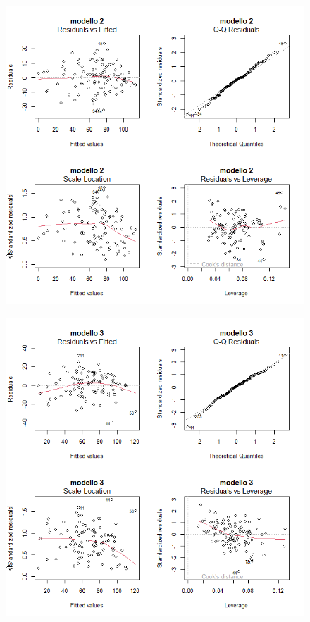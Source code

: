 \begin{figure}[H]
	\centering
	\includegraphics[width=0.95\linewidth]{../graphs/diagnostica/diagnostica_quadrato}
	\label{fig:diagnosticaridotto}
\end{figure}
\begin{figure}[H]
	\centering
	\includegraphics[width=0.95\linewidth]{../graphs/diagnostica/diagnostica_stepwise}
	\label{fig:diagnosticaridotto}
\end{figure}
